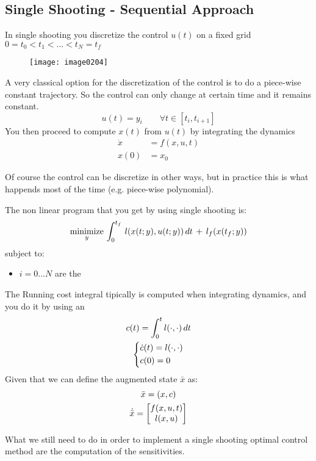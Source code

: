 \subsection{Single Shooting - Sequential Approach}
In single shooting you discretize the control $u(t)$ on a fixed grid $0 = t_0 < t_1 < ... < t_N = t_f$
\begin{figure}[!h]
\centering
\texttt{[image: image0204]}
\end{figure}

A very classical option for the discretization of the control is to do a piece-wise constant trajectory. So the control can only change at certain time and it remains constant.
\[u(t) = y_i \qquad\forall t\in[t_i, t_{i+1}]\]
You then proceed to compute $x(t)$ from $u(t)$ by integrating the dynamics
\begin{align*}
\dot{x} &= f(x,u,t)\\
x(0) &= x_0
\end{align*}

Of course the control can be discretize in other ways, but in practice this is what happends most of the time (e.g. piece-wise polynomial).

The non linear program that you get by using single shooting is:
\[\operatorname*{minimize}_{y}\,\int_{0}^{t_f} \,l(x(t; y), u(t; y))\,dt \,+\,l_f(x(t_f; y))\]
subject to:
\begin{itemize}
\item{ $i=0 ... N$} are the 
\end{itemize}

The Running cost integral tipically is computed when integrating dynamics, and you do it by using an 
\begin{gather*}
c(t) = \int_0^t l(\cdot, \cdot) \,dt\\
\begin{dcases}
\dot{c}(t) = l(\cdot, \cdot)\\
c(0) = 0
\end{dcases}
\end{gather*}
Given that we can define the augmented state $\bar{x}$ as:
\begin{gather*}
\bar{x} = (x,c)\\
\dot{\bar{x}} = \begin{bmatrix}f(x,u,t)\\l(x,u)\end{bmatrix}
\end{gather*}

What we still need to do in order to implement a single shooting optimal control method are the computation of the sensitivities.
